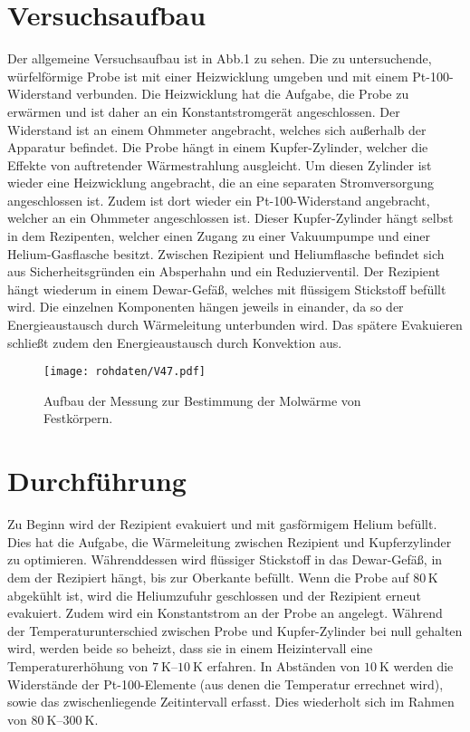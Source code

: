 \newpage

\section{Versuchsaufbau}
Der allgemeine Versuchsaufbau ist in Abb.1 zu sehen. Die zu untersuchende, würfelförmige
Probe ist mit einer Heizwicklung umgeben und mit einem Pt-100-Widerstand verbunden. Die
Heizwicklung hat die Aufgabe, die Probe zu erwärmen und ist daher an ein Konstantstromgerät
angeschlossen. Der Widerstand ist an einem Ohmmeter angebracht, welches sich außerhalb der
Apparatur befindet. Die Probe hängt in einem Kupfer-Zylinder, welcher die Effekte von
auftretender Wärmestrahlung ausgleicht. Um diesen Zylinder ist wieder eine Heizwicklung
angebracht, die an eine separaten Stromversorgung angeschlossen ist. Zudem ist dort wieder
ein Pt-100-Widerstand angebracht, welcher an ein Ohmmeter angeschlossen ist. Dieser
Kupfer-Zylinder hängt selbst in dem Rezipenten, welcher einen
Zugang zu einer Vakuumpumpe und einer Helium-Gasflasche besitzt. Zwischen Rezipient und
Heliumflasche befindet sich aus Sicherheitsgründen ein Absperhahn und ein Reduzierventil.
Der Rezipient hängt wiederum in einem Dewar-Gefäß, welches mit flüssigem Stickstoff befüllt
wird. Die einzelnen Komponenten hängen jeweils in einander, da so der Energieaustausch durch
Wärmeleitung unterbunden wird. Das spätere Evakuieren schließt zudem den Energieaustausch
durch Konvektion aus.
\begin{figure}[h!]
 \centering
 \texttt{[image: rohdaten/V47.pdf]}
 \caption{Aufbau der Messung zur Bestimmung der Molwärme von Festkörpern. \cite{anleitung}}
 \label{fig:Versuchsaufbau1}
\end{figure}
\FloatBarrier

\section{Durchführung}
\label{sec:Durchführung}
Zu Beginn wird der Rezipient evakuiert und mit gasförmigem Helium befüllt.
Dies hat die Aufgabe, die Wärmeleitung zwischen Rezipient und Kupferzylinder zu optimieren.
Währenddessen wird flüssiger Stickstoff in das Dewar-Gefäß, in dem der Rezipiert
hängt, bis zur Oberkante befüllt. Wenn die Probe auf 80$\,$K abgekühlt ist, wird die Heliumzufuhr
geschlossen und der Rezipient erneut evakuiert. Zudem wird ein
Konstantstrom an der Probe an angelegt. Während der Temperaturunterschied zwischen
Probe und Kupfer-Zylinder bei null gehalten wird, werden beide so beheizt, dass sie in einem
Heizintervall eine Temperaturerhöhung von $\SIrange{7}{10}{\kelvin}$ erfahren. In Abständen von
$\SI{10}{\kelvin}$ werden die Widerstände der Pt-100-Elemente (aus denen die Temperatur errechnet wird),
sowie das zwischenliegende Zeitintervall erfasst. Dies wiederholt sich im Rahmen von $\SIrange{80}{300}{\kelvin}$.
